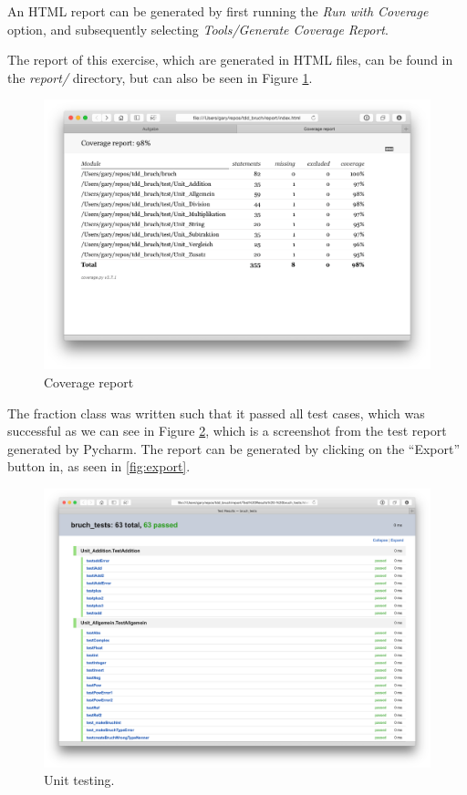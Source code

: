 \documentclass[../main/main.tex]{subfiles}
\begin{document}
An HTML report can be generated by first running the \textit{Run with
  Coverage} option, and subsequently selecting \textit{Tools/Generate
  Coverage Report}.

The report of this exercise, which are generated in HTML files, can be
found in the \textit{report/} directory, but can also be seen in
Figure \ref{fig:coverage}. 

\begin{figure}[H]
  \centering
  \includegraphics[width=\linewidth]{../figures/coverage_report.png}
  \caption{Coverage report}
  \label{fig:coverage}
\end{figure}

The fraction class was written such that it passed all test cases,
which was successful as we can see in Figure \ref{fig:unit}, which is
a screenshot from the test report generated by Pycharm. The report can be generated by clicking on the ``Export'' button in, as seen in \ref{fig:export}.

\begin{figure}[H]
  \centering
  \includegraphics[width=0.7\linewidth]{../figures/unit_testing.png}
  \caption{Unit testing.}
  \label{fig:unit}
\end{figure}
\end{document}
